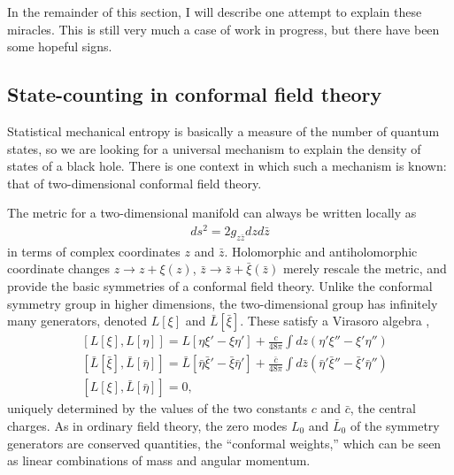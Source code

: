\documentclass[11pt]{article}
\begin{document}
In the remainder of this section, I will describe one attempt to
explain these miracles.  This is still very much a case of work in
progress, but there have been some hopeful signs.

\subsection{State-counting in conformal field theory}

Statistical mechanical entropy is basically a measure of the number
of quantum states, so we are looking for a universal mechanism to
explain the density of states of a black hole.  There is one context
in which such a mechanism is known: that of two-dimensional
conformal field theory.

The metric for a two-dimensional manifold can always be written 
locally as
\begin{align}
ds^2 = 2g_{z{\bar z}}dzd{\bar z}
\label{Carlipi1}
\end{align}
in terms of complex coordinates $z$ and $\bar z$.  Holomorphic 
and antiholomorphic coordinate changes $z\rightarrow z + \xi(z)$,
${\bar z}\rightarrow {\bar z} + {\bar\xi}({\bar z})$ merely rescale the 
metric, and  provide the basic symmetries of a conformal field theory.   
Unlike the conformal symmetry group in higher dimensions, the
two-dimensional group has infinitely many generators, denoted 
$L[\xi]$ and ${\bar L}[{\bar\xi}]$.  These satisfy a Virasoro algebra 
\cite{FMS},
\begin{align}
&[L[\xi],L[\eta]] 
   = L[\eta\xi' - \xi\eta']   + \frac{c}{48\pi}\int dz\left( \eta'\xi'' - \xi'\eta''\right) \nonumber\\
&[{\bar L}[{\bar\xi}],{\bar L}[{\bar\eta}]] 
   = {\bar L}[{\bar\eta}{\bar\xi}' - {\bar\xi}{\bar\eta}']  + \frac{{\bar c}}{48\pi}%
   \int d{\bar z}\left( {\bar\eta}'{\bar\xi}'' - {\bar\xi}'{\bar\eta}''\right) \nonumber\\
&[ L[\xi],{\bar L}[{\bar\eta}]] = 0 , 
\label{Carlipi2}
\end{align}
uniquely determined by the values of the two constants $c$ and $\bar c$, the 
central charges.  As in ordinary field theory, the zero modes $L_0$ and ${\bar L}_0$ 
of the symmetry generators are conserved quantities, the ``conformal weights,''
which can be seen as linear combinations of mass and angular momentum.
\end{document}
